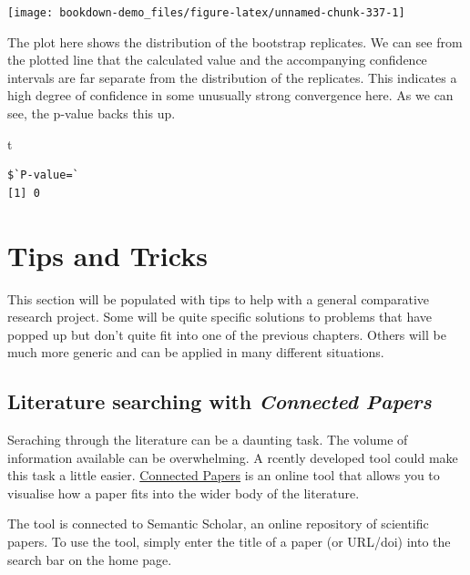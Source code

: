 \documentclass[
]{book}
\newenvironment{Shaded}{\begin{snugshade}}{\end{snugshade}}
\newcommand{\NormalTok}[1]{#1}
\begin{document}
\begin{center}\texttt{[image: bookdown-demo\_files/figure-latex/unnamed-chunk-337-1]} \end{center}

The plot here shows the distribution of the bootstrap replicates. We can see from the plotted line that the calculated value and the accompanying confidence intervals are far separate from the distribution of the replicates. This indicates a high degree of confidence in some unusually strong convergence here. As we can see, the p-value backs this up.

\begin{Shaded}
\begin{Highlighting}[]
\NormalTok{t}
\end{Highlighting}
\end{Shaded}

\begin{verbatim}
$`P-value=`
[1] 0
\end{verbatim}

\hypertarget{tips-and-tricks}{%
\chapter{Tips and Tricks}\label{tips-and-tricks}}

This section will be populated with tips to help with a general comparative research project. Some will be quite specific solutions to problems that have popped up but don't quite fit into one of the previous chapters. Others will be much more generic and can be applied in many different situations.

\hypertarget{literature-searching-with-connected-papers}{%
\section{\texorpdfstring{Literature searching with \emph{Connected Papers}}{Literature searching with Connected Papers}}\label{literature-searching-with-connected-papers}}

Seraching through the literature can be a daunting task. The volume of information available can be overwhelming. A rcently developed tool could make this task a little easier. \href{https://www.connectedpapers.com}{Connected Papers} is an online tool that allows you to visualise how a paper fits into the wider body of the literature.

The tool is connected to Semantic Scholar, an online repository of scientific papers. To use the tool, simply enter the title of a paper (or URL/doi) into the search bar on the home page.
\end{document}
